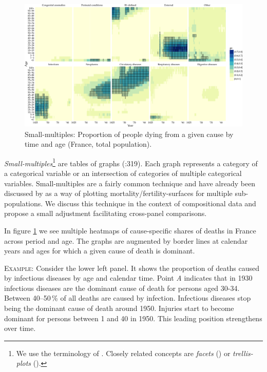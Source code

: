 \documentclass[a4paper, 12pt]{scrartcl}
\begin{document}
\begin{figure}
  \centering
  \includegraphics[width = \linewidth]{../fig/plot-small_multiples.pdf}
  \caption{Small-multiples: Proportion of people dying from a given cause by time and age (France, total population).}
  \label{fig:smg}
\end{figure}

\emph{Small-multiples}\footnote{We use the terminology of \textcite{Tufte1990}. Closely related concepts are \emph{facets} (\cite{Wilkinson2005}) or \emph{trellis-plots} (\cite{Becker1996}).} are tables of graphs (\cite{Wilkinson2005}:319). Each graph represents a category of a categorical variable or an intersection of categories of multiple categorical variables. Small-multiples are a fairly common technique and have already been discussed by \textcite{Vaupel1987} as a way of plotting mortality/fertility-surfaces for multiple sub-populations. We discuss this technique in the context of compositional data and propose a small adjustment facilitating cross-panel comparisons.

In figure \ref{fig:smg} we see multiple heatmaps of cause-specific shares of deaths in France across period and age. The graphs are augmented by border lines at calendar years and ages for which a given cause of death is dominant. 

\textsc{Example:} Consider the lower left panel. It shows the proportion of deaths caused by infectious diseases by age and calendar time. Point \emph{A} indicates that in 1930 infectious diseases are the dominant cause of death for persons aged 30-34. Between 40--50\,\% of all deaths are caused by infection. Infectious diseases stop being the dominant cause of death around 1950. Injuries start to become dominant for persons between 1 and 40 in 1950. This leading position strengthens over time.
\end{document}
